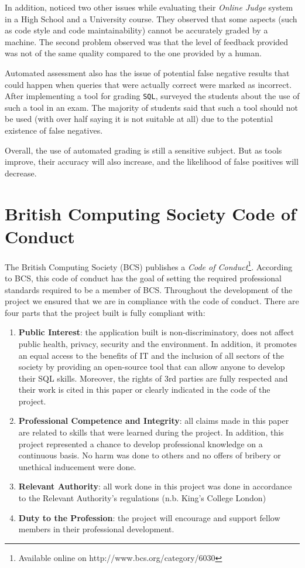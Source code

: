 In addition, \cite{literature:assesment:automated:brenda} noticed two other issues while evaluating their \textit{Online Judge} system in a High School and a University course. They observed that some aspects (such as code style and code maintainability) cannot be accurately graded by a machine. The second problem observed was that the level of feedback provided was not of the same quality compared to the one provided by a human.

Automated assessment also has the issue of potential false negative results that could happen when queries that were actually correct were marked as incorrect. After implementing a tool for grading \texttt{SQL}, \cite{literature:asqlg} surveyed the students about the use of such a tool in an exam. The majority of students said that such a tool should not be used (with over half saying it is not suitable at all) due to the potential existence of false negatives.

Overall, the use of automated grading is still a sensitive subject. But as tools improve, their accuracy will also increase, and the likelihood of false positives will decrease.

\section{British Computing Society Code of Conduct}

The British Computing Society (BCS) publishes a \textit{Code of Conduct}\footnote{Available online on http://www.bcs.org/category/6030}. According to BCS, this code of conduct has the goal of setting the required professional standards required to be a member of BCS. Throughout the development of the project we ensured that we are in compliance with the code of conduct. There are four parts that the project built is fully compliant with:

\begin{enumerate}
    \item \textbf{Public Interest}: the application built is non-discriminatory, does not affect public health, privacy, security and the environment. In addition, it promotes an equal access to the benefits of IT and the inclusion of all sectors of the society by providing an open-source tool that can allow anyone to develop their SQL skills. Moreover, the rights of 3rd parties are fully respected and their work is cited in this paper or clearly indicated in the code of the project.
    \item \textbf{Professional Competence and Integrity}: all claims made in this paper are related to skills that were learned during the project. In addition, this project represented a chance to develop professional knowledge on a continuous basis. No harm was done to others and no offers of bribery or unethical inducement were done.
    \item \textbf{Relevant Authority}: all work done in this project was done in accordance to the Relevant Authority's regulations (n.b. King's College London)
    \item \textbf{Duty to the Profession}: the project will encourage and support fellow members in their professional development.
\end{enumerate}

